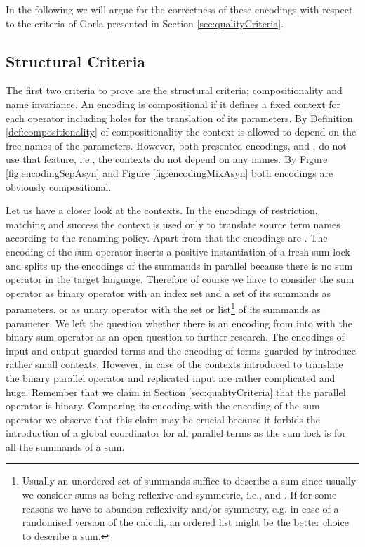 \documentclass[]{llncs}
\begin{document}
In the following we will argue for the correctness of these encodings with respect to the criteria of Gorla presented in Section \ref{sec:qualityCriteria}.

\subsection{Structural Criteria} \label{sec:structuralCriteria}

The first two criteria to prove are the structural criteria; compositionality and name invariance. An encoding is compositional if it defines a fixed context for each operator including holes for the translation of its parameters. By Definition \ref{def:compositionality} of compositionality the context is allowed to depend on the free names of the parameters. However, both presented encodings,  and , do not use that feature, i.e., the contexts do not depend on any names. By Figure \ref{fig:encodingSepAsyn} and Figure \ref{fig:encodingMixAsyn} both encodings are obviously compositional.

Let us have a closer look at the contexts. In the encodings of restriction, matching and success the context is used only to translate source term names according to the renaming policy. Apart from that the encodings are \clean. The encoding of the sum operator inserts a positive instantiation of a fresh sum lock and splits up the encodings of the summands in parallel because there is no sum operator in the target language. Therefore of course we have to consider the sum operator as binary operator with an index set and a set of its summands as parameters, or as unary operator with the set or list\footnote{Usually an unordered set of summands suffice to describe a sum since usually we consider sums as being reflexive and symmetric, i.e.,  and . If for some reasons we have to abandon reflexivity and/or symmetry, e.g. in case of a randomised version of the calculi, an ordered list might be the better choice to describe a sum.} of its summands as parameter. We left the question whether there is an encoding from \piMix into \piAsyn with the binary sum operator as an open question to further research. The encodings of input and output guarded terms and the encoding of terms guarded by  introduce rather small contexts. However, in case of  the contexts introduced to translate the binary parallel operator and replicated input are rather complicated and huge. Remember that we claim in Section \ref{sec:qualityCriteria} that the parallel operator is binary. Comparing its encoding with the encoding of the sum operator we observe that this claim may be crucial because it forbids the introduction of a global coordinator for all parallel terms as the sum lock is for all the summands of a sum.
\end{document}
